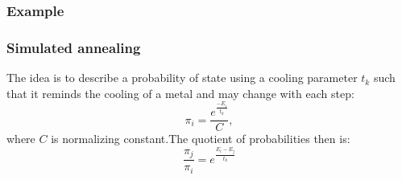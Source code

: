 \begin{frame}
	\frametitle{Example}
	
\end{frame}

\begin{frame}
	\frametitle{Simulated annealing}
	The idea is to describe a probability of state using a cooling parameter $t_k$ such that it reminds the cooling of a metal and may change with each step:
	\begin{equation*}
	\pi_i = \frac{e^{\frac{-E_i}{t_k}}}{C},
	\end{equation*}
	where $C$ is normalizing constant.The quotient of probabilities then is:
	\begin{equation*}
	\frac{\pi_j}{\pi_i} = e^{\frac{E_i - E_j}{t_k}}
	\end{equation*}
\end{frame}
